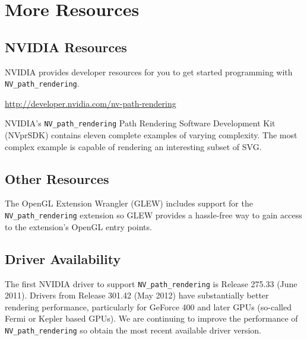 
\section{More Resources}

\subsection{NVIDIA Resources}

NVIDIA provides developer resources for you to get started programming
with {\tt NV\_path\_rendering}.

\hspace{1em}
{\small
\url{http://developer.nvidia.com/nv-path-rendering}
}

NVIDIA's {\tt NV\_path\_rendering} Path Rendering Software Development
Kit (NVprSDK) contains eleven complete examples of varying complexity.
The most complex example is capable of rendering an interesting subset
of SVG.

\subsection{Other Resources}

The OpenGL Extension Wrangler (GLEW) \cite{GLEW} includes support
for the {\tt NV\_path\_rendering} extension so GLEW provides a hassle-free
way to gain
access to the extension's OpenGL entry points.

\subsection{Driver Availability}

The first NVIDIA driver to support {\tt NV\_path\_rendering} is Release
275.33 (June 2011).  Drivers from Release 301.42 (May 2012) have
substantially better rendering performance, particularly for GeForce
400 and later GPUs (so-called Fermi or Kepler based GPUs).
We are continuing to improve the performance of {\tt NV\_path\_rendering}
so obtain the most recent available driver version.
